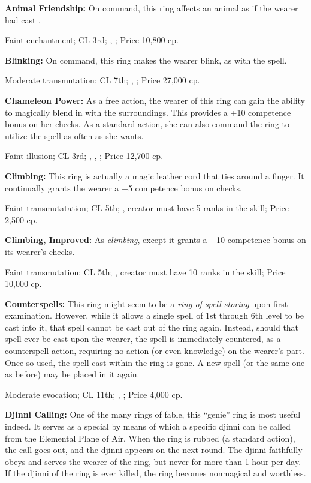 \textbf{Animal Friendship:} On command, this ring affects an animal as if the wearer had cast .

Faint enchantment; CL 3rd; , ; Price 10,800 cp.


\textbf{Blinking:} On command, this ring makes the wearer blink, as with the  spell.

Moderate transmutation; CL 7th; , ; Price 27,000 cp.


\textbf{Chameleon Power:} As a free action, the wearer of this ring can gain the ability to magically blend in with the surroundings. This provides a +10 competence bonus on her  checks. As a standard action, she can also command the ring to utilize the spell  as often as she wants.

Faint illusion; CL 3rd; , , ; Price 12,700 cp.


\textbf{Climbing:} This ring is actually a magic leather cord that ties around a finger. It continually grants the wearer a +5 competence bonus on  checks.

Faint transmutatation; CL 5th; , creator must have 5 ranks in the  skill; Price 2,500 cp.


\textbf{Climbing, Improved:} As \emph{climbing}, except it grants a +10 competence bonus on its wearer's  checks.

Faint transmutation; CL 5th; , creator must have 10 ranks in the  skill; Price 10,000 cp.


\textbf{Counterspells:} This ring might seem to be a \emph{ring of spell storing} upon first examination. However, while it allows a single spell of 1st through 6th level to be cast into it, that spell cannot be cast out of the ring again. Instead, should that spell ever be cast upon the wearer, the spell is immediately countered, as a counterspell action, requiring no action (or even knowledge) on the wearer's part. Once so used, the spell cast within the ring is gone. A new spell (or the same one as before) may be placed in it again.

Moderate evocation; CL 11th; , ; Price 4,000 cp.


\textbf{Djinni Calling:} One of the many rings of fable, this ``genie'' ring is most useful indeed. It serves as a special  by means of which a specific djinni can be called from the Elemental Plane of Air. When the ring is rubbed (a standard action), the call goes out, and the djinni appears on the next round. The djinni faithfully obeys and serves the wearer of the ring, but never for more than 1 hour per day. If the djinni of the ring is ever killed, the ring becomes nonmagical and worthless.

